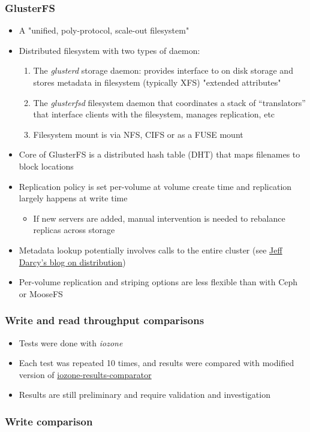 \documentclass[handout]{beamer}
\begin{document}
\begin{frame}
\frametitle{GlusterFS}
\begin{itemize}
\item A "unified, poly-protocol, scale-out filesystem"
\item Distributed filesystem with two types of daemon:
\begin{enumerate}
\item The \emph{glusterd} storage daemon: provides interface to on disk storage and stores metadata in filesystem (typically XFS) "extended attributes"
\item The \emph{glusterfsd} filesystem daemon that coordinates a stack of ``translators'' that interface clients with the filesystem, manages replication, etc
\item Filesystem mount is via NFS, CIFS or as a FUSE mount
\end{enumerate}
\item Core of GlusterFS is a distributed hash table (DHT) that maps filenames to block locations
\pause
\item Replication policy is set per-volume at volume create time and replication largely happens at write time
\begin{itemize}
\item If new servers are added, manual intervention is needed to rebalance replicas across storage
\end{itemize}
\item Metadata lookup potentially involves calls to the entire cluster (see \href{https://web.archive.org/web/20140325114833/http://hekafs.org/index.php/2012/03/glusterfs-algorithms-distribution/}{Jeff Darcy's blog on distribution})
\item Per-volume replication and striping options are less flexible than with Ceph or MooseFS
\end{itemize}
\end{frame}

\begin{frame}
\frametitle{Write and read throughput comparisons}
\begin{itemize}
\item Tests were done with \emph{iozone}
\item Each test was repeated 10 times, and results were compared with modified version of \href{https://code.google.com/p/iozone-results-comparator/}{iozone-results-comparator}
\item Results are still preliminary and require validation and investigation
\end{itemize}
\end{frame}
\begin{frame}
\frametitle{Write comparison}
\end{frame}
\end{document}

